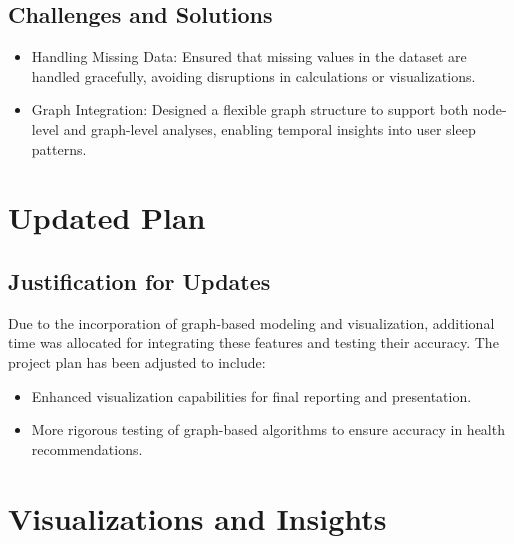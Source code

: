\documentclass{article}
\begin{document}
\subsection{Challenges and Solutions}
\begin{itemize}
    \item Handling Missing Data: Ensured that missing values in the dataset are handled gracefully, avoiding disruptions in calculations or visualizations.
    \item Graph Integration: Designed a flexible graph structure to support both node-level and graph-level analyses, enabling temporal insights into user sleep patterns.
\end{itemize}

\section{Updated Plan}
\subsection{Justification for Updates}
Due to the incorporation of graph-based modeling and visualization, additional time was allocated for integrating these features and testing their accuracy. The project plan has been adjusted to include:
\begin{itemize}
    \item Enhanced visualization capabilities for final reporting and presentation.
    \item More rigorous testing of graph-based algorithms to ensure accuracy in health recommendations.
\end{itemize}

\section{Visualizations and Insights}
\end{document}
